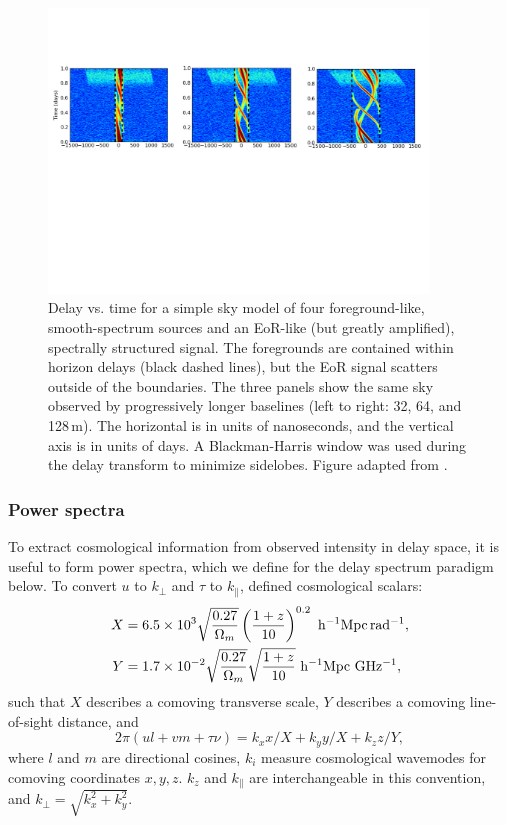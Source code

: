 \begin{figure}
\centering
\includegraphics[width=0.9\textwidth]{chapters/eor_window_theory/figures/parsonsAdapt.pdf}
\caption[Delay vs. time for a simple sky model of four foreground-like, smooth-spectrum sources and an EoR-like (but greatly amplified), spectrally structured signal.]{Delay vs. time for a simple sky model of four foreground-like, smooth-spectrum sources and an EoR-like (but greatly amplified), spectrally structured signal. The foregrounds are contained within horizon delays (black dashed lines), but the EoR signal scatters outside of the boundaries. The three panels show the same sky observed by progressively longer baselines (left to right: 32, 64, and 128\,m). The horizontal is in units of nanoseconds, and the vertical axis is in units of days. A Blackman-Harris window was used during the delay transform to minimize sidelobes. Figure adapted from \cite{Parsons.12a}.}
\label{fig:eor_window_parsons_adapt}
\end{figure}

\subsubsection{Power spectra}

To extract cosmological information from observed intensity in delay space, it is useful to form power spectra, which we define for the delay spectrum paradigm below. To convert $u$ to $k_{\perp}$ and $\tau$ to $k_{\parallel}$, \cite{Parsons.12b} defined cosmological scalars:
\begin{align}
X &= 6.5 \times 10^3 \sqrt{\frac{0.27}{\Omega_m}}\left(\frac{1+z}{10}\right)^{0.2} {\,\,\rm h^{-1} Mpc\,rad^{-1}}, \\
Y &= 1.7 \times 10^{-2} \sqrt{\frac{0.27}{\Omega_m}} \sqrt{\frac{1+z}{10}} {\,\,\rm h^{-1} Mpc\,  \,GHz^{-1}},
\end{align}
such that $X$ describes a comoving transverse scale, $Y$ describes a comoving line-of-sight distance, and
\begin{equation}
2\pi(ul + vm + \tau\nu) = k_x x /X + k_y y/ X + k_z z/Y,
\end{equation}
where $l$ and $m$ are directional cosines, $k_i$ measure cosmological wavemodes for comoving coordinates $x,y,z$. $k_z$ and $k_{\parallel}$ are interchangeable in this convention, and $k_{\perp} = \sqrt{k_x^2 + k_y^2}$.

